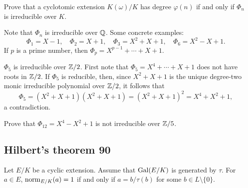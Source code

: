 \begin{exercise}
    Prove that a cyclotomic extension $K(\omega)/K$ has degree $\varphi(n)$ if and only if 
    $\Phi_n$ is irreducible over $K$. 
\end{exercise}

Note that $\Phi_n$ is irreducible over $\mathbb{Q}$. Some concrete examples:
\[
\Phi_1=X-1,
\quad
\Phi_2=X+1,
\quad
\Phi_3=X^2+X+1,
\quad
\Phi_6=X^2-X+1.
\]
If $p$ is a prime number, then $\Phi_p=X^{p-1}+\cdots+X+1$. 

\begin{example}
    $\Phi_5$ is irreducible over $\mathbb{Z}/2$. First note that
    $\Phi_5=X^{4}+\cdots+X+1$ does not have roots in $\mathbb{Z}/2$. If 
    $\Phi_5$ is reducible, then, since
    $X^2+X+1$ is the unique degree-two 
    monic irreducible polynomial 
    over $\mathbb{Z}/2$, it follows that
    \[
    \Phi_5=(X^2+X+1)(X^2+X+1)=(X^2+X+1)^2=X^4+X^2+1,
    \]
    a contradiction.
\end{example}

\begin{exercise}
Prove that
$\Phi_{12}=X^4-X^2+1$ is not irreducible over $\mathbb{Z}/5$. 
\end{exercise}

\subsection{Hilbert's theorem 90}

\begin{theorem}[Hilbert]
    Let $E/K$ be a cyclic extension. Assume that 
    $\operatorname{Gal}(E/K)$ is generated by $\tau$. For 
    $a\in E$, $\operatorname{norm}_{E/K}(a)=1$ if and only 
    if $a=b/\tau(b)$ for some $b\in L\setminus\{0\}$. 
\end{theorem}

